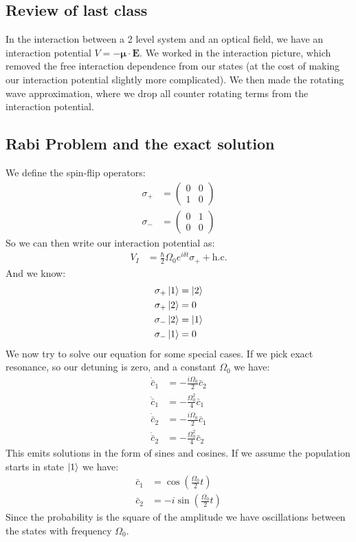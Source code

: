 \subsection{Review of last class}
In the interaction between a 2 level system and an optical field, we have an interaction potential $V= -\bm{\mu}\cdot\bm{E}$. We worked in the interaction picture, which removed the free interaction dependence from our states (at the cost of making our interaction potential slightly more complicated). We then made the rotating wave approximation, where we drop all counter rotating terms from the interaction potential.
\subsection{Rabi Problem and the exact solution}
We define the spin-flip operators:
\begin{align*}
	\sigma_+ &= \begin{pmatrix}
		0 & 0 \\
		1 & 0
	     \end{pmatrix} \\
	\sigma_- &= \begin{pmatrix}
		0 & 1 \\
		0 & 0
	     \end{pmatrix}
\end{align*}
So we can then write our interaction potential as:
\begin{align*}
	V_I &= \frac{\hbar}{2} \Omega_0 e^{i\delta t} \sigma_+ + \text{h.c.}
\end{align*}
And we know:
\begin{align*}
	\sigma_+ \ket{1} &= \ket{2} \\
	\sigma_+ \ket{2} &= 0 \\
	\sigma_- \ket{2} &= \ket{1} \\
	\sigma_- \ket{1} &= 0
\end{align*}
We now try to solve our equation for some special cases. If we pick exact resonance, so our detuning is zero, and a constant $\Omega_0$ we have:
\begin{align*}
	\dot{\bar{c}}_1 &= -\frac{i\Omega_0}{2} \bar{c}_2 \\
	\ddot{\bar{c}}_1 &= -\frac{\Omega_0^2}{4} \bar{c}_1 \\
	\dot{\bar{c}}_2 &= -\frac{i\Omega_0}{2} \bar{c}_1 \\
	\ddot{\bar{c}}_2 &= -\frac{\Omega_0^2}{4} \bar{c}_2
\end{align*}
This emits solutions in the form of sines and cosines. If we assume the population starts in state $\ket{1}$ we have:
\begin{align*}
	\bar{c}_1 &= \cos\left(\frac{\Omega_0}{2} t\right) \\
	\bar{c}_2 &= -i\sin\left(\frac{\Omega_0}{2} t\right)
\end{align*}
Since the probability is the square of the amplitude we have oscillations between the states with frequency $\Omega_0$.


